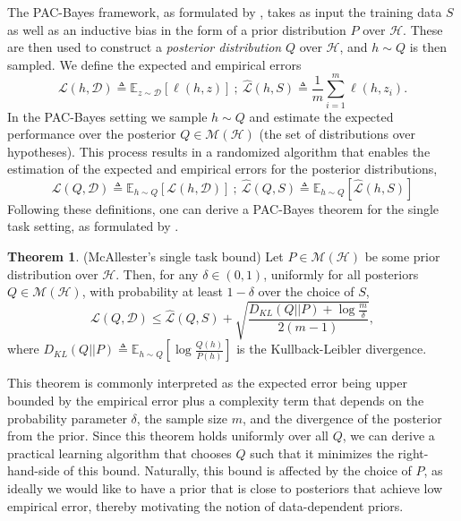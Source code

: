 \documentclass{article} %
\theoremstyle{definition}
\newtheorem{theorem}{Theorem}[section]
\newcommand{\Expect}[2]{\mathbb{E}_{#1}\left [#2 \right ]}
\begin{document}
The PAC-Bayes framework, as formulated by \citet{Mcallester}, takes as input the training data $S$ as well as an inductive bias in the form of a prior distribution $P$ over $\mathcal{H}$. These are then used to construct a \emph{posterior distribution} $Q$ over $\mathcal{H}$, and $h\sim Q$ is then sampled. We define the expected and empirical errors
\begin{equation*}
    \mathcal{L}(h, \mathcal{D}) \triangleq \Expect{z\sim \mathcal{D}}{\ell(h,z)} ~;~ \hat{\mathcal{L}}(h, S)\triangleq \frac{1}{m}\sum_{i=1}^{m} \ell(h,z_i) .
\end{equation*}
In the PAC-Bayes setting we sample $h\sim Q$ and estimate the expected performance over the posterior $Q\in \mathcal{M}(\mathcal{H})$ (the set of distributions over hypotheses). This process results in a randomized algorithm that enables the estimation of the expected and empirical errors for the posterior distributions, 
\begin{equation*}
    \mathcal{L}(Q, \mathcal{D}) \triangleq \Expect{h\sim Q}{\mathcal{L}(h, \mathcal{D})} ~;~ 
    \hat{\mathcal{L}}(Q, S) \triangleq \Expect{h\sim Q}{\hat{\mathcal{L}}(h, S)}
\end{equation*}
Following these definitions, one can derive a PAC-Bayes theorem for the single task setting, as formulated by \citet{Mcallester}. 
%
\begin{theorem} (McAllester's single task bound) \label{thm:classic-pb}
	Let $P\in \mathcal{M}(\mathcal{H})$ be some prior distribution over $\mathcal{H}$. Then, 
	for any $\delta \in (0,1)$, uniformly for all posteriors $Q\in \mathcal{M}(\mathcal{H})$, with probability at least $1-\delta$ over the choice of $S$, $$\mathcal{L}(Q, \mathcal{D}) \leq \hat{\mathcal{L}}(Q, S)+\sqrt{\frac{D_{KL}(Q||P)+\log\frac{m}{\delta}}{2(m-1)}}, $$
	where $D_{KL}(Q||P)\triangleq \Expect{h\sim Q}{\log\frac{Q(h)}{P(h)}}$ is the Kullback-Leibler divergence.
\end{theorem}
%
This theorem is commonly interpreted as the expected error being upper bounded by the empirical error plus a complexity term that depends on the probability parameter $\delta$, the sample size $m$, and the divergence of the posterior from the prior. Since this theorem holds uniformly over all $Q$, we can derive a practical learning algorithm that chooses $Q$ such that it minimizes the right-hand-side of this bound. Naturally, this bound is affected by the choice of $P$, as ideally we would like to have a prior that is close to posteriors that achieve low empirical error, thereby motivating the notion of data-dependent priors.
\end{document}
